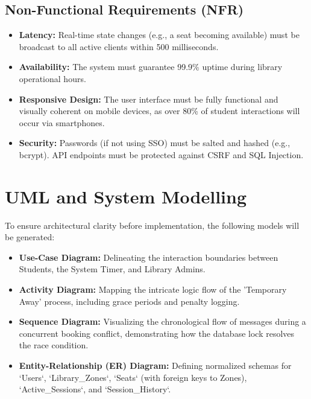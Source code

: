 \documentclass[11pt,a4paper]{article}
\begin{document}
\subsection{Non-Functional Requirements (NFR)}
\begin{itemize}[leftmargin=0.7cm]
    \item \textbf{Latency:} Real-time state changes (e.g., a seat becoming available) must be broadcast to all active clients within 500 milliseconds.
    \item \textbf{Availability:} The system must guarantee 99.9\% uptime during library operational hours.
    \item \textbf{Responsive Design:} The user interface must be fully functional and visually coherent on mobile devices, as over 80\% of student interactions will occur via smartphones.
    \item \textbf{Security:} Passwords (if not using SSO) must be salted and hashed (e.g., bcrypt). API endpoints must be protected against CSRF and SQL Injection.
\end{itemize}

\section{UML and System Modelling}
To ensure architectural clarity before implementation, the following models will be generated:
\begin{itemize}[leftmargin=0.7cm]
    \item \textbf{Use-Case Diagram:} Delineating the interaction boundaries between Students, the System Timer, and Library Admins.
    \item \textbf{Activity Diagram:} Mapping the intricate logic flow of the 'Temporary Away' process, including grace periods and penalty logging.
    \item \textbf{Sequence Diagram:} Visualizing the chronological flow of messages during a concurrent booking conflict, demonstrating how the database lock resolves the race condition.
    \item \textbf{Entity-Relationship (ER) Diagram:} Defining normalized schemas for `Users`, `Library\_Zones`, `Seats` (with foreign keys to Zones), `Active\_Sessions`, and `Session\_History`.
\end{itemize}
\end{document}
